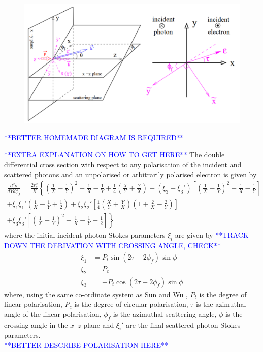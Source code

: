 \documentclass[../main.tex]{subfiles}
\begin{document}
\begin{figure}[!h]
\centering
\includegraphics[width=\textwidth]{Figures/Photon_Production_by_Inverse_Compton_Scattering/SunPolarisationScatteringDiagram.pdf}
\caption{}
\label{fig:3D_coord_system}
\end{figure}
\textcolor{blue}{**BETTER HOMEMADE DIAGRAM IS REQUIRED**}

\textcolor{blue}{**EXTRA EXPLANATION ON HOW TO GET HERE**}
The double differential cross section with respect to any polarisation of the incident and scattered photons and an unpolarised or arbitrarily polarised electron is given by 
\begin{multline}
\frac{d^{2}\sigma}{dYd\phi_{f}} = \frac{2r_{e}^{2}}{X}\left\{\left(\frac{1}{X}-\frac{1}{Y}\right)^{2}+\frac{1}{X}-\frac{1}{Y}+\frac{1}{4}\left(\frac{X}{Y}+\frac{Y}{X}\right)  -\left(\xi_{3}+\xi_{3}'\right)\left[\left(\frac{1}{X}-\frac{1}{Y}\right)^{2}+\frac{1}{X}-\frac{1}{Y}\right] \right.\\\left. +\xi_{1}\xi_{1}'\left(\frac{1}{X}-\frac{1}{Y}+\frac{1}{2}\right) + \xi_{2}\xi_{2}'\left[\frac{1}{4}\left(\frac{X}{Y}+\frac{Y}{X}\right)\left(1+\frac{2}{X}-\frac{2}{Y}\right)\right] \right.\\\left. + \xi_{3}\xi_{3}'\left[\left(\frac{1}{X}-\frac{1}{Y}\right)^{2}+\frac{1}{X}-\frac{1}{Y}+\frac{1}{2}\right] \right\}
\label{eq:polarisation_differential_cross_section}    
\end{multline}
where the initial incident photon Stokes parameters $\xi_{i}$ are given by \textcolor{blue}{**TRACK DOWN THE DERIVATION WITH CROSSING ANGLE, CHECK**}
\begin{align}
\xi_{1} &= P_{t}\sin\left(2\tau-2\phi_{f}\right)\sin\phi\\
\xi_{2} &= P_{c} \\
\xi_{3} &= -P_{t}\cos\left(2\tau-2\phi_{f}\right)\sin\phi
\label{eq:incident_stokes_parameters}    
\end{align}
where, using the same co-ordinate system as Sun and Wu \cite{sun2009characterizations,sun2011theoretical}, $P_{t}$ is the degree of linear polarisation, $P_{c}$ is the degree of circular polarisation, $\tau$ is the azimuthal angle of the linear polarisation, $\phi_{f}$ is the azimuthal scattering angle, $\phi$ is the crossing angle in the $x$--$z$ plane and $\xi_{i}'$ are the final scattered photon Stokes parameters. \textcolor{blue}{\\**BETTER DESCRIBE POLARISATION HERE**}
\end{document}
